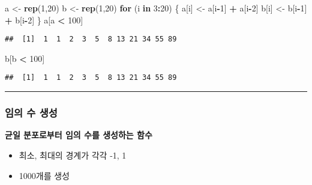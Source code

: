 \documentclass[]{article}
\newenvironment{Shaded}{\begin{snugshade}}{\end{snugshade}}
\newcommand{\KeywordTok}[1]{\textcolor[rgb]{0.13,0.29,0.53}{\textbf{#1}}}
\newcommand{\DecValTok}[1]{\textcolor[rgb]{0.00,0.00,0.81}{#1}}
\newcommand{\StringTok}[1]{\textcolor[rgb]{0.31,0.60,0.02}{#1}}
\newcommand{\ControlFlowTok}[1]{\textcolor[rgb]{0.13,0.29,0.53}{\textbf{#1}}}
\newcommand{\OperatorTok}[1]{\textcolor[rgb]{0.81,0.36,0.00}{\textbf{#1}}}
\newcommand{\NormalTok}[1]{#1}
\providecommand{\tightlist}{%
  \setlength{\itemsep}{0pt}\setlength{\parskip}{0pt}}
\begin{document}
\begin{Shaded}
\begin{Highlighting}[]
\NormalTok{a <-}\StringTok{ }\KeywordTok{rep}\NormalTok{(}\DecValTok{1}\NormalTok{,}\DecValTok{20}\NormalTok{)}
\NormalTok{b <-}\StringTok{ }\KeywordTok{rep}\NormalTok{(}\DecValTok{1}\NormalTok{,}\DecValTok{20}\NormalTok{)}
\ControlFlowTok{for}\NormalTok{ (i }\ControlFlowTok{in} \DecValTok{3}\OperatorTok{:}\DecValTok{20}\NormalTok{) \{}
\NormalTok{    a[i] <-}\StringTok{ }\NormalTok{a[i}\OperatorTok{-}\DecValTok{1}\NormalTok{] }\OperatorTok{+}\StringTok{ }\NormalTok{a[i}\OperatorTok{-}\DecValTok{2}\NormalTok{]}
\NormalTok{    b[i] <-}\StringTok{ }\NormalTok{b[i}\OperatorTok{-}\DecValTok{1}\NormalTok{] }\OperatorTok{+}\StringTok{ }\NormalTok{b[i}\OperatorTok{-}\DecValTok{2}\NormalTok{]}
\NormalTok{\}}
\NormalTok{a[a }\OperatorTok{<}\StringTok{ }\DecValTok{100}\NormalTok{]}
\end{Highlighting}
\end{Shaded}

\begin{verbatim}
##  [1]  1  1  2  3  5  8 13 21 34 55 89
\end{verbatim}

\begin{Shaded}
\begin{Highlighting}[]
\NormalTok{b[b }\OperatorTok{<}\StringTok{ }\DecValTok{100}\NormalTok{]}
\end{Highlighting}
\end{Shaded}

\begin{verbatim}
##  [1]  1  1  2  3  5  8 13 21 34 55 89
\end{verbatim}

\begin{center}\rule{0.5\linewidth}{\linethickness}\end{center}

\subsubsection{임의 수 생성}\label{--}

\textbf{균일 분포로부터 임의 수를 생성하는 함수}

\begin{itemize}
\tightlist
\item
  최소, 최대의 경계가 각각 -1, 1
\item
  1000개를 생성
\end{itemize}
\end{document}
